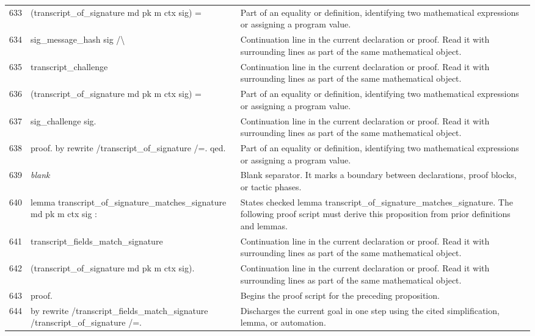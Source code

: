 \documentclass[10pt]{article}
\begin{document}
\begin{longtable}{r L{0.53\textwidth} L{0.37\textwidth}}
633 & {\ttfamily\scriptsize     (transcript\_of\_signature md pk m ctx sig) =} & Part of an equality or definition, identifying two mathematical expressions or assigning a program value. \\
634 & {\ttfamily\scriptsize     sig\_message\_hash sig /\textbackslash{}} & Continuation line in the current declaration or proof.  Read it with surrounding lines as part of the same mathematical object. \\
635 & {\ttfamily\scriptsize   transcript\_challenge} & Continuation line in the current declaration or proof.  Read it with surrounding lines as part of the same mathematical object. \\
636 & {\ttfamily\scriptsize     (transcript\_of\_signature md pk m ctx sig) =} & Part of an equality or definition, identifying two mathematical expressions or assigning a program value. \\
637 & {\ttfamily\scriptsize     sig\_challenge sig.} & Continuation line in the current declaration or proof.  Read it with surrounding lines as part of the same mathematical object. \\
638 & {\ttfamily\scriptsize proof. by rewrite /transcript\_of\_signature /=. qed.} & Part of an equality or definition, identifying two mathematical expressions or assigning a program value. \\
639 & {\ttfamily\scriptsize \emph{blank}} & Blank separator.  It marks a boundary between declarations, proof blocks, or tactic phases. \\
640 & {\ttfamily\scriptsize lemma transcript\_of\_signature\_matches\_signature md pk m ctx sig :} & States checked lemma transcript\_of\_signature\_matches\_signature.  The following proof script must derive this proposition from prior definitions and lemmas. \\
641 & {\ttfamily\scriptsize   transcript\_fields\_match\_signature} & Continuation line in the current declaration or proof.  Read it with surrounding lines as part of the same mathematical object. \\
642 & {\ttfamily\scriptsize     (transcript\_of\_signature md pk m ctx sig).} & Continuation line in the current declaration or proof.  Read it with surrounding lines as part of the same mathematical object. \\
643 & {\ttfamily\scriptsize proof.} & Begins the proof script for the preceding proposition. \\
644 & {\ttfamily\scriptsize by rewrite /transcript\_fields\_match\_signature /transcript\_of\_signature /=.} & Discharges the current goal in one step using the cited simplification, lemma, or automation. \\

\end{longtable}
\end{document}
